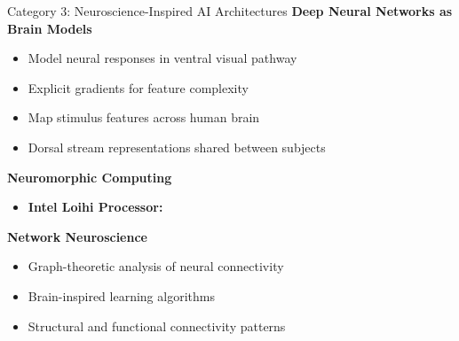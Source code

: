 \documentclass[aspectratio=169]{beamer}
\begin{document}
\begin{frame}{Category 3: Neuroscience-Inspired AI Architectures}
  \textbf{Deep Neural Networks as Brain Models}
  \begin{itemize}
    \item Model neural responses in ventral visual pathway \cite{gucluDeepNeuralNetworks2015}
    \item Explicit gradients for feature complexity
    \item Map stimulus features across human brain
    \item Dorsal stream representations shared between subjects
  \end{itemize}
  
  \vspace{0.5em}
  
  \textbf{Neuromorphic Computing}
  \begin{itemize}
    \item \textbf{Intel Loihi Processor:} \cite{daviesLoihiNeuromorphicManycore2018}
  \end{itemize}
  
  \vspace{0.5em}
  
  \textbf{Network Neuroscience}
  \begin{itemize}
    \item Graph-theoretic analysis of neural connectivity \cite{bassettNetworkNeuroscience2017}
    \item Brain-inspired learning algorithms
    \item Structural and functional connectivity patterns
  \end{itemize}
\end{frame}
\end{document}
